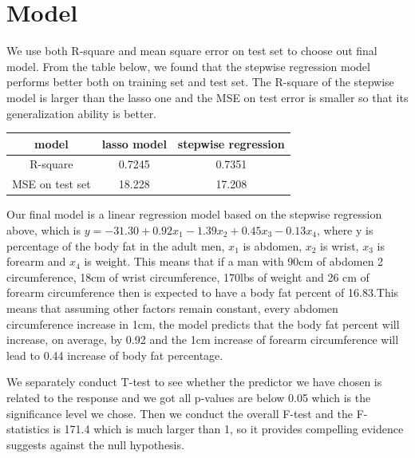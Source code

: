 \documentclass[12pt]{article}
\begin{document}
\section{\vspace{-0.3cm}Model}
We use both R-square and mean square error on test set to choose out final model. From the table below, we found that the stepwise regression model performs better both on training set and test set. The R-square of the stepwise model is larger than the lasso one and the MSE on test error is smaller so that its generalization ability is better.

\begin{center}
\begin{tabular}{ c c c}
\hline
  model & lasso model & stepwise regression \\ 
   \hline
 R-square & 0.7245 & 0.7351 \\  
  \hline
 MSE on test set &18.228  & 17.208\\
  \hline
\end{tabular}
\end{center}
Our final model is a linear regression model based on the stepwise regression above, which is $y = -31.30 + 0.92x_1 -1.39x_2 +0.45x_3 -0.13x_4$, where y is percentage of the body fat in the adult men, $x_1$ is abdomen, $x_2$ is wrist, $x_3$ is forearm and $x_4$ is weight. This means that if a man with 90cm of abdomen 2 circumference, 18cm of wrist circumference, 170lbs of weight and 26 cm of forearm circumference then is expected to have a body fat percent of 16.83.This means that assuming other factors remain constant, every abdomen circumference increase in 1cm, the model predicts that the body fat percent will increase, on average, by 0.92 and the 1cm increase of forearm circumference will lead to 0.44 increase of body fat percentage.
\newline

We separately conduct T-test to see whether the predictor we have chosen is related to the response and we got all p-values are below 0.05 which is the significance level we chose. Then we conduct the overall F-test and the F-statistics is 171.4 which is much larger than 1, so it provides compelling evidence suggests against the null hypothesis.
\vspace{-0.6cm}
\end{document}
